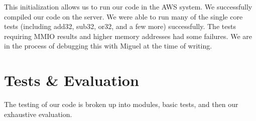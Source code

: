 \documentclass{article}
\begin{document}
This initialization allows us to run our code in the AWS system. We successfully compiled our code on the server. We were able to run many of the single core tests (including add32, sub32, or32, and a few more) successfully. The tests requiring MMIO results and higher memory addresses had some failures.
 We are in the process of debugging this with Miguel at the time of writing. 




\section{Tests \& Evaluation}

The testing of our code is broken up into modules, basic tests, and then our exhaustive evaluation.
\end{document}
